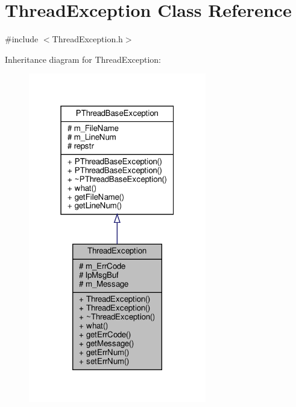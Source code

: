 \hypertarget{classThreadException}{}\section{Thread\+Exception Class Reference}
\label{classThreadException}


{\ttfamily \#include $<$Thread\+Exception.\+h$>$}



Inheritance diagram for Thread\+Exception\+:\nopagebreak
\begin{figure}[H]
\begin{center}
\leavevmode
\includegraphics[width=220pt]{classThreadException__inherit__graph}
\end{center}
\end{figure}

